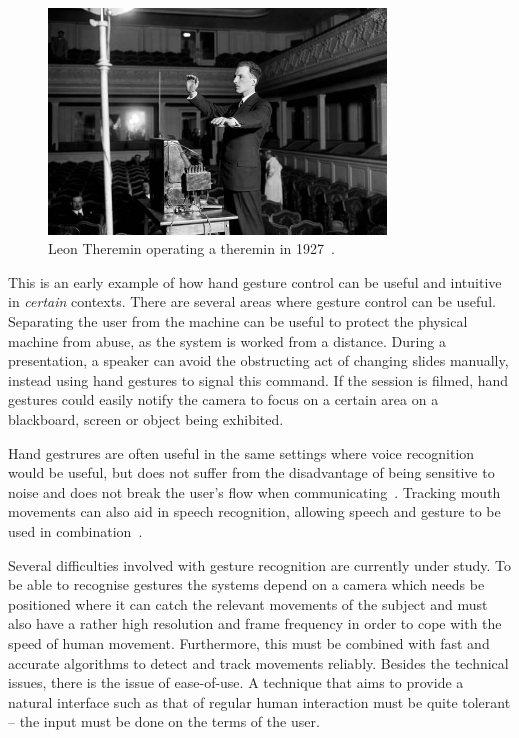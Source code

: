 \begin{figure}[]
\includegraphics[width=0.8\textwidth] {bilder/teremin.jpg}
\caption{Leon Theremin operating a theremin in 1927~\cite{theremin}.}
\label{theremin}
\end{figure}

This is an early example of how hand gesture control can be useful and intuitive in \emph{certain} contexts. There are several areas where gesture control can be useful. Separating the user from the machine can be useful to protect the physical machine from abuse, as the system is worked from a distance. During a presentation, a speaker can avoid the obstructing act of changing slides manually, instead using hand gestures to signal this command. If the session is filmed, hand gestures could easily notify the camera to focus on a certain area on a blackboard, screen or object being exhibited.

Hand gestrures are often useful in the same settings where voice recognition would be useful, but does not suffer from the disadvantage of being sensitive to noise and does not break the user's flow when communicating~\cite{Hardenberg01bare-handhuman-computer}. Tracking mouth movements can also aid in speech recognition, allowing speech and gesture to be used in combination~\cite{conf/icmcs/LiuK10, conf/icmcs/SarginAKOYWEYT06}.

Several difficulties involved with gesture recognition are currently under study. To be able to recognise gestures the systems depend on a camera which needs be positioned where it can catch the relevant movements of the subject and must also have a rather high resolution and frame frequency in order to cope with the speed of human movement. Furthermore, this must be combined with fast and accurate algorithms to detect and track movements reliably. Besides the technical issues, there is the issue of ease-of-use. A technique that aims to provide a natural interface such as that of regular human interaction must be quite tolerant -- the input must be done on the terms of the user. 

